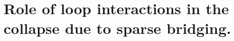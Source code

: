 \documentclass[
preprint,
a4paper,
12pt,
superscriptaddress,
pre]{revtex4}
\begin{document}
\appendix







  


%

\section{Role of loop interactions in the collapse due to sparse
  bridging.}
\label{sec:incl-star-polym}
\end{document}
